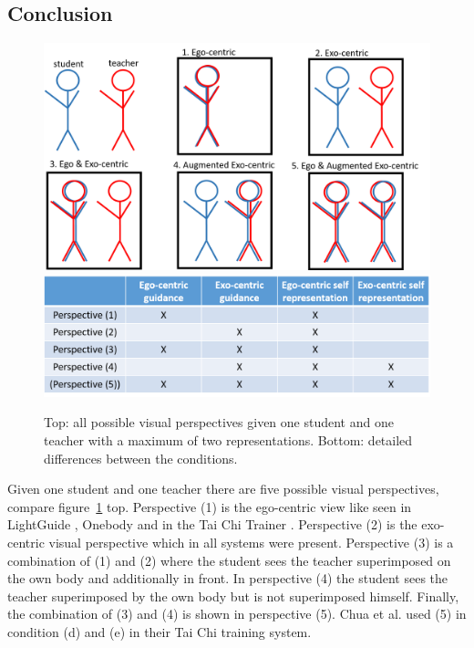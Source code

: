 \newpage
\subsection{Conclusion}
\begin{figure}[h]
	\centering
	\includegraphics[width=1.0\textwidth]{img/perspectives.png}
	\includegraphics[width=1.0\textwidth]{img/cond_detail.png}
	\caption{Top: all possible visual perspectives given one student and one teacher with a maximum of two representations. Bottom: detailed differences between the conditions.}
	\label{fig:perspectives}
\end{figure}
Given one student and one teacher there are five possible visual perspectives, compare figure~\ref{fig:perspectives} top. Perspective (1) is the ego-centric view like seen in LightGuide \cite{Sodhi2012}, Onebody \cite{Hoang2016} and in the Tai Chi Trainer \cite{Chua2003}. Perspective (2) is the exo-centric visual perspective which in all systems were present. Perspective (3) is a combination of (1) and (2) where the student sees the teacher superimposed on the own body and additionally in front. In perspective (4) the student sees the teacher superimposed by the own body but is not superimposed himself. Finally, the combination of (3) and (4) is shown in perspective (5). Chua et al. used (5) in condition (d) and (e) in their Tai Chi training system.
